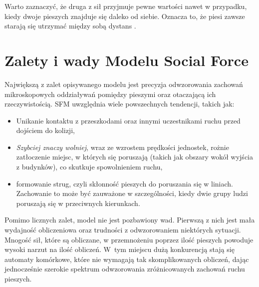 Warto zaznaczyć, że druga z sił przyjmuje pewne wartości nawet w przypadku, kiedy dwoje pieszych znajduje się daleko od siebie. Oznacza to, że piesi zawsze starają się utrzymać między sobą dystans \cite{relativeVelocity}.


\section{Zalety i wady Modelu Social Force}

Największą z zalet opisywanego modelu jest precyzja odwzorowania zachowań mikroskopowych oddziaływań pomiędzy pieszymi oraz otaczającą ich rzeczywistością. SFM uwzględnia wiele powszechnych tendencji, takich jak:

\begin{itemize}
\item Unikanie kontaktu z przeszkodami oraz innymi uczestnikami ruchu przed dojściem do kolizji,
\item \textit{Szybciej znaczy wolniej}, wraz ze wzrostem prędkości jednostek, rożnie zatłoczenie miejsc, w których się poruszają (takich jak obszary wokół wyjścia z budynków), co skutkuje spowolnieniem ruchu,
\item formowanie strug, czyli skłonność pieszych do poruszania się w liniach. Zachowanie to może być zauważone w szczególności, kiedy dwie grupy ludzi poruszają się w przeciwnych kierunkach.
\end{itemize}
Pomimo licznych zalet, model nie jest pozbawiony wad. Pierwszą z nich jest mała wydajność obliczeniowa oraz trudności z odwzorowaniem niektórych sytuacji. Mnogość sił, które są obliczane, w przemnożeniu poprzez ilość pieszych powoduje wysoki narzut na ilość obliczeń. W~tym miejscu dużą konkurencją stają się automaty komórkowe, które nie wymagają tak skomplikowanych obliczeń, dając jednocześnie szerokie spektrum odwzorowania zróżnicowanych zachowań ruchu pieszych.
